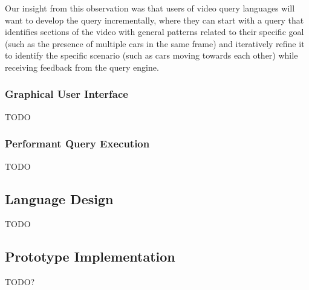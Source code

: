Our insight from this observation was that users of video query languages will want to develop the query incrementally, where they can start with a query that identifies sections of the video with general patterns related to their specific goal (such as the presence of multiple cars in the same frame) and iteratively refine it to identify the specific scenario (such as cars moving towards each other) while receiving feedback from the query engine.

\subsubsection{Graphical User Interface}
TODO

\subsubsection{Performant Query Execution}
TODO

\subsection{Language Design}
TODO

\subsection{Prototype Implementation}
TODO?
